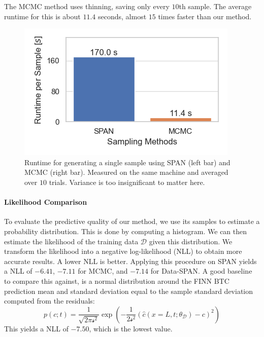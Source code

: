 The MCMC method uses thinning, saving only every $10$th sample. The average runtime for this is about $11.4$ seconds, almost $15$ times faster than our method.

\begin{figure}[h]
    \centering
    \includegraphics{figs/runtime_per_sample.png}
    \caption{Runtime for generating a single sample using SPAN (left bar) and MCMC (right bar). Measured on the same machine and averaged over $10$ trials. Variance is too insignificant to matter here.}
    \label{fig:runtime_per_sample}
\end{figure}



\paragraph{Likelihood Comparison}
\label{sec:likelihood}
To evaluate the predictive quality of our method, we use its samples to estimate a probability distribution. This is done by computing a histogram. We can then estimate the likelihood of the training data $\mathcal{D}$ given this distribution. We transform the likelihood into a negative log-likelihood (NLL) to obtain more accurate results. A lower NLL is better. Applying this procedure on SPAN yields a NLL of $-6.41$, $-7.11$ for MCMC, and $-7.14$ for Data-SPAN. A good baseline to compare this against, is a normal distribution around the FINN BTC prediction mean and standard deviation equal to the sample standard deviation computed from the residuals:
\begin{equation*}
    p(c; t) = \frac{1}{\sqrt{2 \pi \mathcal{s}^2}} \exp(-\frac{1}{2 \mathcal{s}^2} (\hat{c}(x=L, t; \theta_{\mathcal{D}}) - c)^2)
\end{equation*}
This yields a NLL of $-7.50$, which is the lowest value. %



